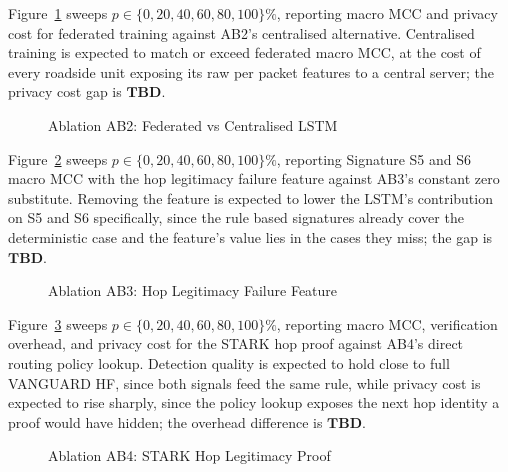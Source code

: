 \documentclass[final,5p,twocolumn]{elsarticle}
\theoremstyle{remark}
\theoremstyle{plain}
\newcommand{\TBD}{\textbf{TBD}} %
\begin{document}
Figure~\ref{fig:ab2} sweeps $p \in \{0,20,40,60,80,100\}\%$, reporting
macro MCC and privacy cost for federated training against AB2's
centralised alternative. Centralised training is expected to match or
exceed federated macro MCC, at the cost of every roadside unit exposing
its raw per packet features to a central server; the privacy cost gap is
$\TBD$.
\begin{figure}[!t]
	\centering
	\caption{Ablation AB2: Federated vs Centralised LSTM}
	\label{fig:ab2}
\end{figure}

Figure~\ref{fig:ab3} sweeps $p \in \{0,20,40,60,80,100\}\%$, reporting
Signature S5 and S6 macro MCC with the hop legitimacy failure feature
against AB3's constant zero substitute. Removing the feature is expected
to lower the LSTM's contribution on S5 and S6 specifically, since the
rule based signatures already cover the deterministic case and the
feature's value lies in the cases they miss; the gap is $\TBD$.
\begin{figure}[!t]
	\centering
	\caption{Ablation AB3: Hop Legitimacy Failure Feature}
	\label{fig:ab3}
\end{figure}

Figure~\ref{fig:ab4} sweeps $p \in \{0,20,40,60,80,100\}\%$, reporting
macro MCC, verification overhead, and privacy cost for the STARK hop
proof against AB4's direct routing policy lookup. Detection quality is
expected to hold close to full VANGUARD HF, since both signals feed the
same rule, while privacy cost is expected to rise sharply, since the
policy lookup exposes the next hop identity a proof would have hidden;
the overhead difference is $\TBD$.
\begin{figure}[!t]
	\centering
	\caption{Ablation AB4: STARK Hop Legitimacy Proof}
	\label{fig:ab4}
\end{figure}
\end{document}
